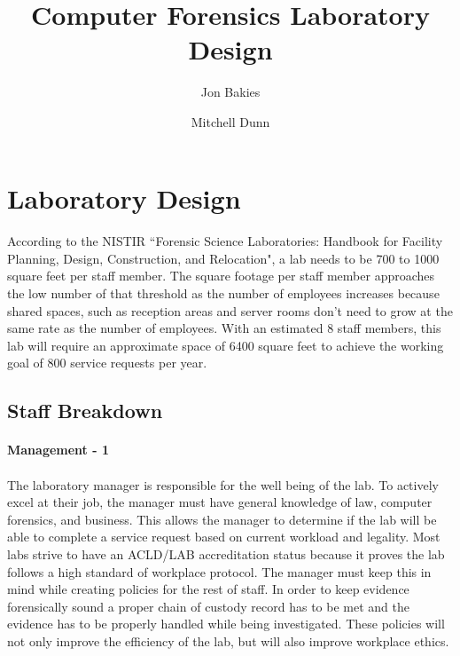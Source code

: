 \documentclass{article}
\begin{document}
\title{Computer Forensics Laboratory Design}
\author{Jon Bakies \and Mitchell Dunn} 

\maketitle
\newpage

\tableofcontents
\newpage

\section{Laboratory Design}
\paragraph{} According to the NISTIR ``Forensic Science Laboratories: Handbook for Facility Planning, Design, Construction, and Relocation", a lab needs to be 700 to 1000 square feet per staff member.
The square footage per staff member approaches the low number of that threshold as the number of employees increases because shared spaces, such as reception areas and server rooms don't need to grow at the same rate as the number of employees.
With an estimated 8 staff members, this lab will require an approximate space of 6400 square feet to achieve the working goal of 800 service requests per year.

\subsection{Staff Breakdown}
\paragraph {Management - 1} 
\paragraph{} The laboratory manager is responsible for the well being of the lab.
To actively excel at their job, the manager must have general knowledge of law, computer forensics, and business.
This allows the manager to determine if the lab will be able to complete a service request based on current workload and legality. 
Most labs strive to have an ACLD/LAB accreditation status because it proves the lab follows a high standard of workplace protocol.
The manager must keep this in mind while creating policies for the rest of staff.
In order to keep evidence forensically sound a proper chain of custody record has to be met and the evidence has to be properly handled while being investigated.
These policies will not only improve the efficiency of the lab, but will also improve workplace ethics.
\end{document}

